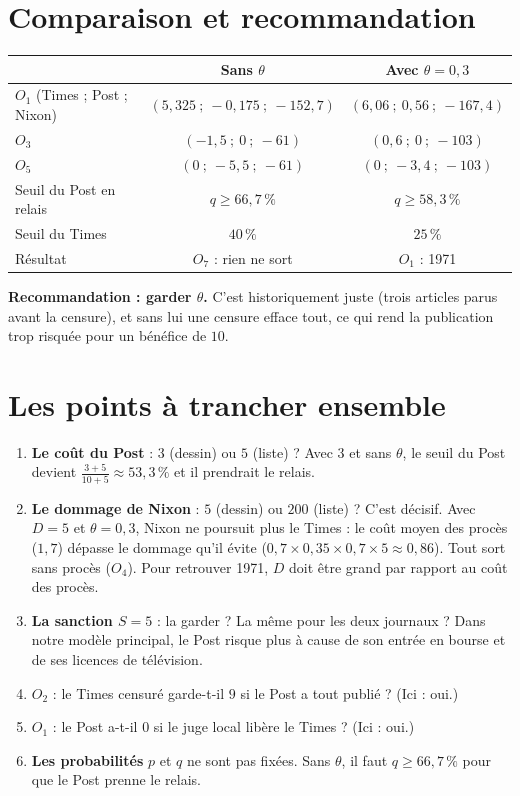 \documentclass[11pt,a4paper]{article}
\theoremstyle{definition}
\begin{document}
\section{Comparaison et recommandation}
\begin{center}
\small
\begin{tabular}{@{}lcc@{}}
\toprule
 & Sans $\theta$ & Avec $\theta=0,3$ \\
\midrule
$O_1$ (Times ; Post ; Nixon) & $(5,325\ ;\ -0,175\ ;\ -152,7)$ & $(6,06\ ;\ 0,56\ ;\ -167,4)$ \\
$O_3$ & $(-1,5\ ;\ 0\ ;\ -61)$ & $(0,6\ ;\ 0\ ;\ -103)$ \\
$O_5$ & $(0\ ;\ -5,5\ ;\ -61)$ & $(0\ ;\ -3,4\ ;\ -103)$ \\
Seuil du Post en relais & $q\ge66,7\,\%$ & $q\ge58,3\,\%$ \\
Seuil du Times & $40\,\%$ & $25\,\%$ \\
Résultat & $O_7$ : rien ne sort & $O_1$ : 1971 \\
\bottomrule
\end{tabular}
\end{center}
\begin{simple}
\textbf{Recommandation : garder $\theta$.} C'est historiquement juste (trois articles parus avant la censure), et sans lui une censure efface tout, ce qui rend la publication trop risquée pour un bénéfice de $10$.
\end{simple}

\section{Les points à trancher ensemble}
\begin{enumerate}[leftmargin=*,itemsep=3pt]
\item \textbf{Le coût du Post} : $3$ (dessin) ou $5$ (liste) ? Avec $3$ et sans $\theta$, le seuil du Post devient $\frac{3+5}{10+5}\approx53,3\,\%$ et il prendrait le relais.
\item \textbf{Le dommage de Nixon} : $5$ (dessin) ou $200$ (liste) ? C'est décisif. Avec $D=5$ et $\theta=0,3$, Nixon ne poursuit plus le Times : le coût moyen des procès ($1,7$) dépasse le dommage qu'il évite ($0,7\times0,35\times0,7\times5\approx0,86$). Tout sort sans procès ($O_4$). Pour retrouver 1971, $D$ doit être grand par rapport au coût des procès.
\item \textbf{La sanction $S=5$} : la garder ? La même pour les deux journaux ? Dans notre modèle principal, le Post risque plus à cause de son entrée en bourse et de ses licences de télévision.
\item \textbf{$O_2$} : le Times censuré garde-t-il $9$ si le Post a tout publié ? (Ici : oui.)
\item \textbf{$O_1$} : le Post a-t-il $0$ si le juge local libère le Times ? (Ici : oui.)
\item \textbf{Les probabilités} $p$ et $q$ ne sont pas fixées. Sans $\theta$, il faut $q\ge66,7\,\%$ pour que le Post prenne le relais.
\end{enumerate}
\end{document}
